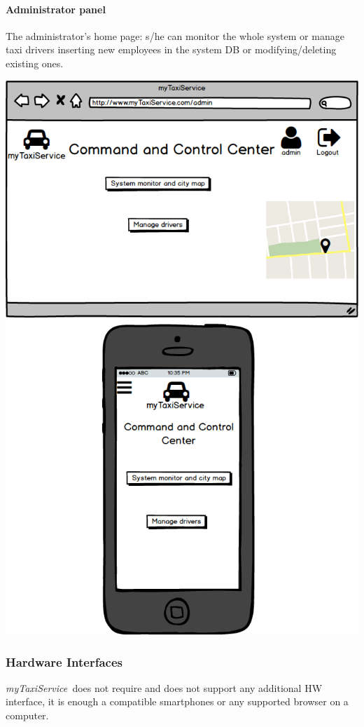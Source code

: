 \documentclass[a4paper,11pt]{report} %
\newcommand{\mts}{\mbox{\normalfont\itshape myTaxiService\ }}
\begin{document}
	\paragraph{Administrator panel} The administrator's home page: s/he can monitor the whole system or manage taxi drivers inserting new employees in the system DB or modifying/deleting existing ones.
	\begin{center}
		\includegraphics[width=0.9\linewidth]{Pictures/AdminPage}
	\end{center}
	\pagebreak	
	
	\subsubsection{Hardware Interfaces} \mts does not require and does not support any additional HW interface, it is enough a compatible smartphones or any supported browser on a computer.
	
\end{document}
